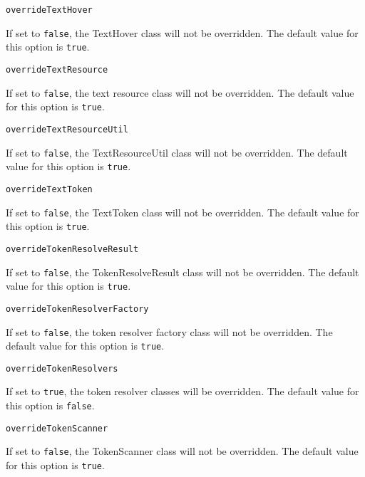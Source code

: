 \noindent\texttt{overrideTextHover}
\begin{myindentpar}{1cm}
If set to \texttt{false}, the TextHover class will not be overridden. The default value for this option is \texttt{true}.
\end{myindentpar}

\noindent\texttt{overrideTextResource}
\begin{myindentpar}{1cm}
If set to \texttt{false}, the text resource class will not be overridden. The default value for this option is \texttt{true}.
\end{myindentpar}

\noindent\texttt{overrideTextResourceUtil}
\begin{myindentpar}{1cm}
If set to \texttt{false}, the TextResourceUtil class will not be overridden. The default value for this option is \texttt{true}.
\end{myindentpar}

\noindent\texttt{overrideTextToken}
\begin{myindentpar}{1cm}
If set to \texttt{false}, the TextToken class will not be overridden. The default value for this option is \texttt{true}.
\end{myindentpar}

\noindent\texttt{overrideTokenResolveResult}
\begin{myindentpar}{1cm}
If set to \texttt{false}, the TokenResolveResult class will not be overridden. The default value for this option is \texttt{true}.
\end{myindentpar}

\noindent\texttt{overrideTokenResolverFactory}
\begin{myindentpar}{1cm}
If set to \texttt{false}, the token resolver factory class will not be overridden. The default value for this option is \texttt{true}.
\end{myindentpar}

\noindent\texttt{overrideTokenResolvers}
\begin{myindentpar}{1cm}
If set to \texttt{true}, the token resolver classes will be overridden. The default value for this option is \texttt{false}.
\end{myindentpar}

\noindent\texttt{overrideTokenScanner}
\begin{myindentpar}{1cm}
If set to \texttt{false}, the TokenScanner class will not be overridden. The default value for this option is \texttt{true}.
\end{myindentpar}

